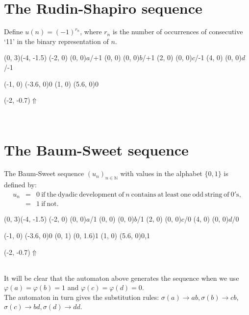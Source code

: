 \documentclass{article}
\begin{document}
\section*{The Rudin-Shapiro sequence}
Define $u(n) = (-1)^{r_n}$, where $r_n$ is the number of occurrences of
consecutive `11' in the binary representation of $n$.

\begin{graph}(0, 3)(-4, -1.5)
  (-2, 0) (0, 0){$a$/+1}
  (0, 0)  (0, 0){$b$/+1}
  (2, 0)  (0, 0){$c$/-1}
  (4, 0)  (0, 0){$d$/-1}

  (-1, 0) \freetext(-3.6, 0){0}
   
   
   
   
   
  (1, 0) \freetext(5.6, 0){0}
   

  \freetext(-2, -0.7){$\Uparrow$}
\end{graph}\\

\section*{The Baum-Sweet sequence}
The Baum-Sweet sequence $(u_n)_{n \in \mathbb{N}}$ with values in the alphabet
$\{0, 1\}$ is defined by:
\begin{eqnarray*}
u_n &=& 0 \mathrm{\ if\ the\ dyadic\ development\ of\ } n
          \mathrm{\ contains\ at\ least\ one\ odd\ string\ of\ 0's},\\
    &=& 1 \mathrm{\ if\ not.}
\end{eqnarray*}
\begin{graph}(0, 3)(-4, -1.5)
  (-2, 0) (0, 0){$a$/1}
  (0, 0)  (0, 0){$b$/1}
  (2, 0)  (0, 0){$c$/0}
  (4, 0)  (0, 0){$d$/0}

  (-1, 0) \freetext(-3.6, 0){0}
   
   
  (0, 1) \freetext(0, 1.6){1}
   
   
  (1, 0) \freetext(5.6, 0){0,1}

  \freetext(-2, -0.7){$\Uparrow$}
\end{graph}\\
It will be clear that the automaton above generates the sequence when we use
$\varphi(a) = \varphi(b) = 1$ and $\varphi(c) = \varphi(d) = 0$.\\
The automaton in turn gives the substitution rules:
$\sigma(a) \rightarrow ab, \sigma(b) \rightarrow cb$,
$\sigma(c) \rightarrow bd, \sigma(d) \rightarrow dd$.
\end{document}
